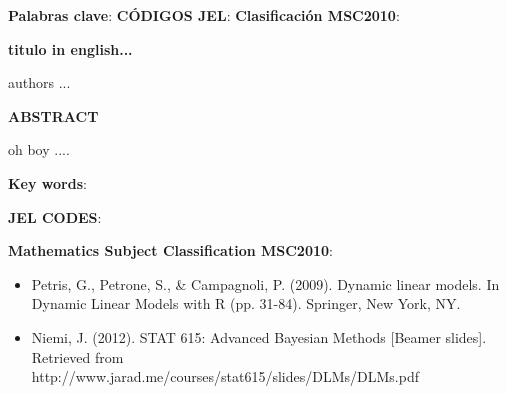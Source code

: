 \documentclass[12pt]{article}\usepackage[]{graphicx}\usepackage[]{color}
\begin{document}
\textbf{Palabras clave}:  
\textbf{C\'ODIGOS JEL}: 
\vspace{0.5cm}
\textbf{Clasificaci\'on MSC2010}: 

\begin{center}
	\textbf{titulo in english...}
\end{center}

\begin{center}
authors ... 
\end{center}

\begin{center}
	\textbf{ABSTRACT}
\end{center}

oh boy .... 

\textbf{Key words}:  

\textbf{JEL CODES}: 

\textbf{Mathematics Subject Classification MSC2010}: 

\pagebreak
\pagestyle{fancy}
\fancyhf{}
\fancyhead[LE,RO]{\thepage}


\renewcommand{\refname}{Referencias Bibliográficas}

% 
% 

\begin{itemize}
\item Petris, G., Petrone, S., \& Campagnoli, P. (2009). Dynamic linear models. In Dynamic Linear Models with R (pp. 31-84). Springer, New York, NY.

\item Niemi, J. (2012). STAT 615: Advanced Bayesian Methods [Beamer slides]. Retrieved from http://www.jarad.me/courses/stat615/slides/DLMs/DLMs.pdf

\end{itemize}
\end{document}
